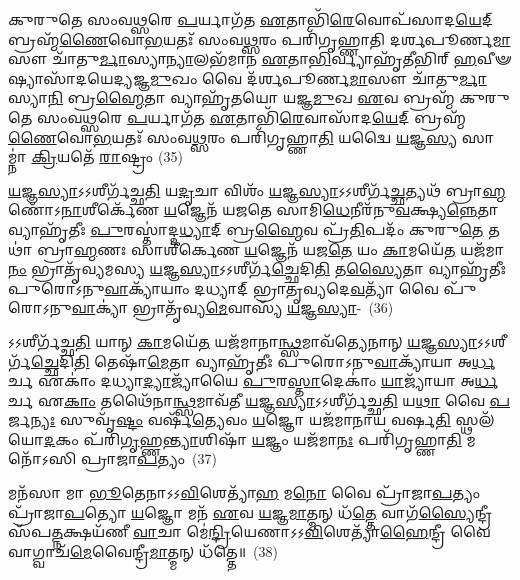𑌕𑍁𑌰𑍁𑌤𑍇 𑌸𑌂𑌵\-\ul{𑌥𑍍𑌸}\-𑌰𑍇 \ul{𑌪}\-𑌰𑍍𑌯𑌾𑌗᳴𑌤 \ul{𑌏}\-𑌤𑌾𑌭𑌿᳴\-\ul{𑌰𑍇}\-𑌵𑍋𑌪᳴𑌸𑌾𑌦\-\ul{𑌯𑍇}\-𑌦𑍍 𑌬𑍍𑌰𑌹𑍍𑌮᳴\-\ul{𑌣𑍈}\-𑌵𑍋\-\ul{𑌭}\-𑌯𑌤𑌃᳴ 𑌸𑌂𑌵\-\ul{𑌥𑍍𑌸}\-𑌰𑌂 𑌪𑌰𑌿᳴𑌗𑍃𑌹𑍍𑌣𑌾𑌤𑌿 𑌦𑌰𑍍\mbox{}𑌶𑌪𑍂𑌰𑍍𑌣\-\ul{𑌮𑌾}\-𑌸𑍗 𑌚𑌾᳴𑌤𑍁\-\ul{𑌰𑍍𑌮𑌾}\-𑌸𑍍𑌯𑌾\-\ul{𑌨𑍍𑌯𑌾}\-𑌲𑌭᳴𑌮𑌾𑌨 \ul{𑌏}\-𑌤𑌾\-\ul{𑌭𑌿}\-𑌰𑍍𑌵𑍍𑌯𑌾𑌹𑍃᳴𑌤𑍀𑌭𑌿𑌰𑍍\mbox{} \ul{𑌹}\-𑌵𑍀𑍟𑌷𑍍𑌯𑌾𑌸𑌾᳴𑌦\-𑌯𑍇𑌦𑍍𑌯𑌜𑍍𑌞\-\ul{𑌮𑍁}\-𑌖𑌂 𑌵𑍈 𑌦᳴𑌰𑍍\mbox{}𑌶𑌪𑍂𑌰𑍍𑌣\-\ul{𑌮𑌾}\-𑌸𑍗 𑌚𑌾᳴𑌤𑍁\-\ul{𑌰𑍍𑌮𑌾}\-𑌸𑍍𑌯𑌾\-\ul{𑌨𑌿} 𑌬𑍍𑌰\-\ul{𑌹𑍍𑌮𑍈}\-𑌤𑌾 𑌵𑍍𑌯𑌾𑌹𑍃᳴𑌤𑌯𑍋 𑌯𑌜𑍍𑌞\-\ul{𑌮𑍁}\-𑌖 \ul{𑌏}\-𑌵 𑌬𑍍𑌰𑌹𑍍𑌮᳴ 𑌕𑍁𑌰𑍁𑌤𑍇 𑌸𑌂𑌵\-\ul{𑌥𑍍𑌸}\-𑌰𑍇 \ul{𑌪}\-𑌰𑍍𑌯𑌾𑌗᳴𑌤 \ul{𑌏}\-𑌤𑌾𑌭𑌿᳴\-\ul{𑌰𑍇}\-𑌵𑌾𑌸𑌾᳴𑌦\-\-\ul{𑌯𑍇}\-𑌦𑍍 𑌬𑍍𑌰𑌹𑍍𑌮᳴\-\ul{𑌣𑍈}\-𑌵𑍋\-\ul{𑌭}\-𑌯𑌤𑌃᳴ 𑌸𑌂𑌵\-\ul{𑌥𑍍𑌸}\-𑌰𑌂 𑌪𑌰𑌿᳴𑌗𑍃𑌹𑍍𑌣𑌾\-\ul{𑌤𑌿} 𑌯𑌦𑍍𑌵𑍈 \ul{𑌯}\-𑌜𑍍𑌞\-\ul{𑌸𑍍𑌯} 𑌸𑌾𑌮𑍍𑌨𑌾॑ \ul{𑌕𑍍𑌰𑌿}\-𑌯𑌤𑍇᳴ \ul{𑌰𑌾}\-𑌷𑍍𑌟𑍍𑌰𑌂~(35)

\-\ul{𑌯}\-𑌜𑍍𑌞\-\ul{𑌸𑍍𑌯𑌾}\-\-𑌽\-𑌽𑌶𑍀𑌰𑍍𑌗᳴𑌚𑍍𑌛\-\ul{𑌤𑌿} 𑌯\-\ul{𑌦𑍃}\-𑌚𑌾 𑌵𑌿𑌶𑌂᳴ \ul{𑌯}\-𑌜𑍍𑌞\-\ul{𑌸𑍍𑌯𑌾}\-\-𑌽\-𑌽𑌶𑍀𑌰𑍍𑌗᳴\-\ul{𑌚𑍍𑌛}\-𑌤𑍍𑌯𑌥᳴ 𑌬𑍍𑌰𑌾\-\ul{𑌹𑍍𑌮}\-𑌣𑍋᳴\-𑌽\-\ul{𑌨𑌾}\-𑌶𑍀𑌰𑍍𑌕𑍇᳴𑌣 \ul{𑌯}\-𑌜𑍍𑌞𑍇𑌨᳴ 𑌯𑌜𑌤𑍇 𑌸𑌾𑌮𑌿\-\ul{𑌧𑍇}\-𑌨𑍀𑌰᳴𑌨𑍁\-\ul{𑌵}\-𑌕𑍍𑌷𑍍𑌯\-\ul{𑌨𑍍𑌨𑍇}\-𑌤𑌾 𑌵𑍍𑌯𑌾𑌹𑍃᳴𑌤𑍀𑌃 \ul{𑌪𑍁}\-𑌰𑌸𑍍𑌤𑌾॑𑌦𑍍𑌦\-\ul{𑌧𑍍𑌯𑌾}\-𑌦𑍍 𑌬𑍍𑌰\-\ul{𑌹𑍍𑌮𑍈}\-𑌵 𑌪𑍍𑌰᳴\-\ul{𑌤𑌿}\-𑌪𑌦𑌂᳴ 𑌕𑍁𑌰𑍁\-\ul{𑌤𑍇} 𑌤𑌥𑌾॑ 𑌬𑍍𑌰𑌾\-\ul{𑌹𑍍𑌮}\-𑌣𑌃 𑌸𑌾𑌶𑍀॑𑌰𑍍𑌕𑍇𑌣 \ul{𑌯}\-𑌜𑍍𑌞𑍇𑌨᳴ 𑌯𑌜\-\ul{𑌤𑍇} 𑌯𑌂 \ul{𑌕𑌾}\-𑌮𑌯𑍇᳴\-\ul{𑌤} 𑌯𑌜᳴𑌮𑌾\-\ul{𑌨𑌂} 𑌭𑍍𑌰𑌾𑌤𑍃᳴𑌵𑍍𑌯𑌮𑌸𑍍𑌯 \ul{𑌯}\-𑌜𑍍𑌞\-\ul{𑌸𑍍𑌯𑌾}\-\-𑌽\-𑌽𑌶𑍀𑌰𑍍𑌗᳴\-\ul{𑌚𑍍𑌛𑍇}\-𑌦𑌿\-\ul{𑌤𑌿} 𑌤\-\ul{𑌸𑍍𑌯𑍈}\-𑌤𑌾 𑌵𑍍𑌯𑌾𑌹𑍃᳴𑌤𑍀𑌃 𑌪𑍁𑌰𑍋\-𑌽𑌨𑍁\-\ul{𑌵𑌾}\-𑌕𑍍𑌯𑌾᳴𑌯𑌾𑌂 𑌦𑌧𑍍𑌯𑌾𑌦𑍍 𑌭𑍍𑌰𑌾𑌤𑍃𑌵𑍍𑌯𑌦𑍇\-\ul{𑌵}\-𑌤𑍍𑌯𑌾᳴ 𑌵𑍈 𑌪𑍁᳴𑌰𑍋\-𑌽𑌨𑍁\-\ul{𑌵𑌾}\-𑌕𑍍𑌯𑌾॑ 𑌭𑍍𑌰𑌾𑌤𑍃᳴𑌵𑍍𑌯\-\ul{𑌮𑍇}\-𑌵𑌾𑌸𑍍𑌯᳴ \ul{𑌯}\-𑌜𑍍𑌞\-\ul{𑌸𑍍𑌯𑌾}\--~(36)

𑌽𑌽𑌶𑍀𑌰𑍍𑌗᳴𑌚𑍍𑌛\-\ul{𑌤𑌿} 𑌯𑌾𑌨𑍍 \ul{𑌕𑌾}\-𑌮𑌯𑍇᳴\-\ul{𑌤} 𑌯𑌜᳴𑌮𑌾𑌨𑌾\-\ul{𑌨𑍍𑌥𑍍𑌸}\-𑌮𑌾𑌵᳴𑌤𑍍𑌯𑍇𑌨𑌾𑌨𑍍 \ul{𑌯}\-𑌜𑍍𑌞\-\ul{𑌸𑍍𑌯𑌾}\-\-𑌽\-𑌽𑌶𑍀𑌰𑍍𑌗᳴\-\ul{𑌚𑍍𑌛𑍇}\-𑌦𑌿\-\ul{𑌤𑌿} 𑌤𑍇𑌷𑌾᳴\-\ul{𑌮𑍇}\-𑌤𑌾 𑌵𑍍𑌯𑌾𑌹𑍃᳴𑌤𑍀𑌃 𑌪𑍁𑌰𑍋\-𑌽𑌨𑍁\-\ul{𑌵𑌾}\-𑌕𑍍𑌯𑌾᳴𑌯𑌾 𑌅\-\ul{𑌰𑍍𑌧}\-𑌰𑍍𑌚 𑌏𑌕𑌾𑌂॑ 𑌦𑌧𑍍𑌯𑌾\-\ul{𑌦𑍍𑌯𑌾}\-𑌜𑍍𑌯𑌾᳴𑌯𑍈 \ul{𑌪𑍁}\-𑌰\-\ul{𑌸𑍍𑌤𑌾}\-𑌦𑍇𑌕𑌾𑌂॑ \ul{𑌯𑌾}\-𑌜𑍍𑌯𑌾᳴𑌯𑌾 𑌅\-\ul{𑌰𑍍𑌧}\-𑌰𑍍𑌚 𑌏\-\ul{𑌕𑌾𑌂} 𑌤𑌥𑍈᳴𑌨𑌾\-\ul{𑌨𑍍𑌥𑍍𑌸}\-𑌮𑌾𑌵᳴𑌤𑍀 \ul{𑌯}\-𑌜𑍍𑌞\-\ul{𑌸𑍍𑌯𑌾}\-\-𑌽\-𑌽𑌶𑍀𑌰𑍍𑌗᳴𑌚𑍍𑌛\-\ul{𑌤𑌿} 𑌯\-\ul{𑌥𑌾} 𑌵𑍈 \ul{𑌪}\-𑌰𑍍𑌜\-\ul{𑌨𑍍𑌯𑌃} 𑌸𑍁𑌵𑍃᳴\-\ul{𑌷𑍍𑌟𑌂} 𑌵𑌰𑍍\mbox{}𑌷᳴\-\ul{𑌤𑍍𑌯𑍇}\-𑌵𑌂 \ul{𑌯}\-𑌜𑍍𑌞𑍋 𑌯𑌜᳴𑌮𑌾𑌨𑌾𑌯 𑌵𑌰𑍍\mbox{}𑌷\-\ul{𑌤𑌿} 𑌸𑍍𑌥𑌲᳴𑌯𑍋\-\ul{𑌦}\-𑌕𑌂 𑌪᳴𑌰𑌿\-\ul{𑌗𑍃}\-𑌹𑍍𑌣\-\ul{𑌨𑍍𑌤𑍍𑌯𑌾}\-𑌶𑌿𑌷𑌾᳴ \ul{𑌯}\-𑌜𑍍𑌞𑌂 𑌯𑌜᳴𑌮𑌾\-\ul{𑌨𑌃} 𑌪𑌰𑌿᳴𑌗𑍃𑌹𑍍𑌣𑌾\-\ul{𑌤𑌿} 𑌮𑌨𑍋᳴\-𑌽𑌸𑌿 𑌪𑍍𑌰𑌾𑌜𑌾\-\ul{𑌪}\-𑌤𑍍𑌯𑌂~(37)

𑌮𑌨᳴𑌸𑌾 𑌮𑌾 \ul{𑌭𑍂}\-𑌤𑍇𑌨𑌾\-𑌽\-𑌽\-\ul{𑌵𑌿}\-𑌶𑍇𑌤𑍍𑌯𑌾᳴\-\ul{𑌹} 𑌮\-\ul{𑌨𑍋} 𑌵𑍈 𑌪𑍍𑌰𑌾᳴𑌜𑌾\-\ul{𑌪}\-𑌤𑍍𑌯𑌂 𑌪𑍍𑌰𑌾᳴𑌜𑌾\-\ul{𑌪}\-𑌤𑍍𑌯𑍋 \ul{𑌯}\-𑌜𑍍𑌞𑍋 𑌮𑌨᳴ \ul{𑌏}\-𑌵 \ul{𑌯}\-𑌜𑍍𑌞\-\ul{𑌮𑌾}\-𑌤𑍍𑌮𑌨𑍍 𑌧᳴\-\ul{𑌤𑍍𑌤𑍇} 𑌵𑌾𑌗᳴\-\ul{𑌸𑍍𑌯𑍈}\-𑌨𑍍𑌦𑍍𑌰𑍀 𑌸᳴𑌪\-\ul{𑌤𑍍𑌨}\-𑌕𑍍𑌷𑌯᳴𑌣𑍀 \ul{𑌵𑌾}\-𑌚𑌾 𑌮𑍇॑\-\ul{𑌨𑍍𑌦𑍍𑌰𑌿}\-𑌯𑍇𑌣𑌾\-𑌽\-𑌽\-\ul{𑌵𑌿}\-𑌶𑍇𑌤𑍍𑌯𑌾᳴\-\ul{𑌹𑍈}\-𑌨𑍍𑌦𑍍𑌰𑍀 𑌵𑍈 𑌵𑌾𑌗𑍍𑌵𑌾𑌚᳴\-\ul{𑌮𑍇}\-𑌵𑍈𑌨𑍍𑌦𑍍𑌰𑍀\-\ul{𑌮𑌾}\-𑌤𑍍𑌮𑌨𑍍 𑌧᳴𑌤𑍍𑌤𑍇॥~(38)

